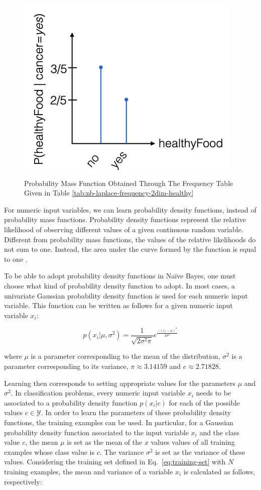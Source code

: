 \begin{figure}[h]
\centering
\includegraphics[scale=0.3]{"Part 3 - Learning Systems/Supervised Learning/Naive Bayes/figures/nb-mass-function.png"} %
\caption{Probability Mass Function Obtained Through The Frequency Table Given in Table \ref{tab:nb-laplace-frequency-2dim-healthy}}
\end{figure}

For numeric input variables, we can learn probability density functions, instead of probability mass functions. Probability density functions represent the relative likelihood of observing different values of a given continuous random variable. Different from probability mass functions, the values of the relative likelihoods do not sum to one. Instead, the area under the curve formed by the function is equal to one \cite{MathsForML}. 

To be able to adopt probability density functions in Na\"{i}ve Bayes, one must choose what kind of probability density function to adopt. In most cases, a univariate Gaussian probability density function is used for each numeric input variable. This function can be written as follows for a given numeric input variable $x_i$:

\[ p(x_i|\mu,\sigma^2) = \frac{1}{\sqrt{2 \sigma^2 \pi}} e^{\frac{-(x_i - \mu)^2}{2 \sigma^2}}\]

\noindent where $\mu$ is a parameter corresponding to the mean of the distribution, $\sigma^2$ is a parameter corresponding to its variance, $\pi \approx 3.14159$ and $e \approx 2.71828$.

Learning then corresponds to setting appropriate values for the parameters $\mu$ and $\sigma^2$. In classification problems, every numeric input variable $x_i$ needs to be associated to a probability density function $p(x_i|c)$ for each of the possible values $c \in \mathcal{Y}$. In order to learn the parameters of these probability density functions, the training examples can be used. In particular, for a Gaussian probability density function associated to the input variable $x_i$ and the class value $c$, the mean $\mu$ is set as the mean of the $x$ values values of all training examples whose class value is $c$. The variance $\sigma^2$ is set as the variance of these values. Considering the training set defined in Eq.~\ref{eq:training-set} with $N$ training examples, the mean and variance of a variable $x_i$ is calculated as follows, respectively:

